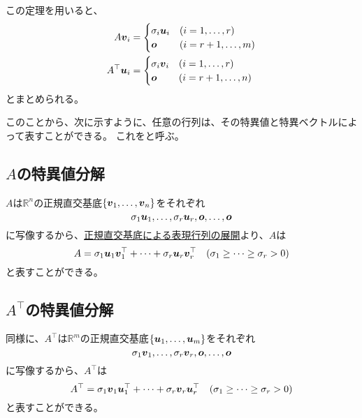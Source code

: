 \documentclass[../../../topic_linear-algebra]{subfiles}
\begin{document}
\br

この定理を用いると、
\begin{align*}
  A\vb*{v}_i       & = \begin{cases}
                         \sigma_i \vb*{u}_i & (i = 1,\ldots,r)   \\
                         \vb*{o}            & (i = r+1,\ldots,m)
                       \end{cases}  \\
  A^\top \vb*{u}_i & = \begin{cases}
                         \sigma_i \vb*{v}_i & (i = 1,\ldots, r)   \\
                         \vb*{o}            & (i = r+1,\ldots, n)
                       \end{cases}
\end{align*}
とまとめられる。

\br

このことから、次に示すように、任意の行列は、その特異値と特異ベクトルによって表すことができる。
これをと呼ぶ。

\subsection{$A$の特異値分解}\label{sec:svd-of-A}

$A$は$\mathbb{R}^n$の正規直交基底$\{ \vb*{v}_1, \ldots, \vb*{v}_n \}$をそれぞれ
\begin{equation*}
  \sigma_1\vb*{u}_1,\ldots,\sigma_r\vb*{u}_r,\vb*{o},\ldots,\vb*{o}
\end{equation*}
に写像するから、\hyperref[thm:orthobasis-formula-for-rep-matrix]{正規直交基底による表現行列の展開}より、$A$は
\begin{equation*}
  A = \sigma_1\vb*{u}_1\vb*{v}_1^\top + \cdots + \sigma_r \vb*{u}_r \vb*{v}_r^\top \quad (\sigma_1 \geq \cdots \geq \sigma_r > 0)
\end{equation*}
と表すことができる。

\subsection{$A^\top$の特異値分解}\label{sec:svd-of-transpose-A}

同様に、$A^\top$は$\mathbb{R}^m$の正規直交基底$\{ \vb*{u}_1, \ldots, \vb*{u}_m\}$をそれぞれ
\begin{equation*}
  \sigma_1\vb*{v}_1, \ldots, \sigma_r\vb*{v}_r,\vb*{o},\ldots,\vb*{o}
\end{equation*}
に写像するから、$A^\top$は
\begin{equation*}
  A^\top = \sigma_1\vb*{v}_1\vb*{u}_1^\top + \cdots + \sigma_r \vb*{v}_r \vb*{u}_r^\top \quad (\sigma_1 \geq \cdots \geq \sigma_r > 0)
\end{equation*}
と表すことができる。
\end{document}
